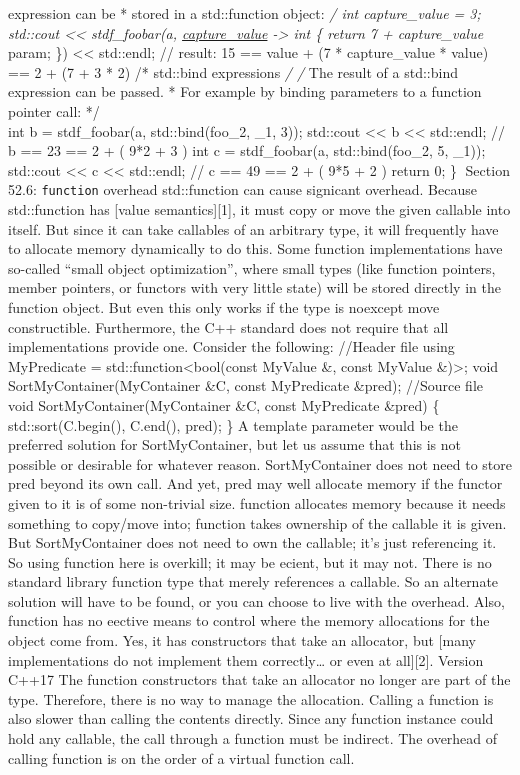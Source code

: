 expression can be * stored in a std::function object: \emph{/ int
capture\_value = 3; std::cout \textless\textless{} stdf\_foobar(a,
\href{int\%20param}{capture\_value} -\textgreater{} int \{ return 7 +
capture\_value } param; \}) \textless\textless{} std::endl; // result:
15 == value + (7 * capture\_value * value) == 2 + (7 + 3 * 2) /*
std::bind expressions \emph{/ /} The result of a std::bind expression
can be passed. * For example by binding parameters to a function pointer
call: */\\
int b = stdf\_foobar(a, std::bind(foo\_2, \_1, 3)); std::cout
\textless\textless{} b \textless\textless{} std::endl; // b == 23 == 2 +
( 9*2 + 3 ) int c = stdf\_foobar(a, std::bind(foo\_2, 5, \_1));
std::cout \textless\textless{} c \textless\textless{} std::endl; // c ==
49 == 2 + ( 9*5 + 2 ) return 0; \} Section 52.6:
\passthrough{\lstinline!function!} overhead std::function can cause
signicant overhead. Because std::function has {[}value
semantics{]}{[}1{]}, it must copy or move the given callable into
itself. But since it can take callables of an arbitrary type, it will
frequently have to allocate memory dynamically to do this. Some function
implementations have so-called ``small object optimization'', where
small types (like function pointers, member pointers, or functors with
very little state) will be stored directly in the function object. But
even this only works if the type is noexcept move constructible.
Furthermore, the C++ standard does not require that all implementations
provide one. Consider the following: //Header file using MyPredicate =
std::function\textless bool(const MyValue \&, const MyValue
\&)\textgreater; void SortMyContainer(MyContainer \&C, const MyPredicate
\&pred); //Source file void SortMyContainer(MyContainer \&C, const
MyPredicate \&pred) \{ std::sort(C.begin(), C.end(), pred); \} A
template parameter would be the preferred solution for SortMyContainer,
but let us assume that this is not possible or desirable for whatever
reason. SortMyContainer does not need to store pred beyond its own call.
And yet, pred may well allocate memory if the functor given to it is of
some non-trivial size. function allocates memory because it needs
something to copy/move into; function takes ownership of the callable it
is given. But SortMyContainer does not need to own the callable; it's
just referencing it. So using function here is overkill; it may be
ecient, but it may not. There is no standard library function type that
merely references a callable. So an alternate solution will have to be
found, or you can choose to live with the overhead. Also, function has
no eective means to control where the memory allocations for the object
come from. Yes, it has constructors that take an allocator, but {[}many
implementations do not implement them correctly\ldots{} or even at
all{]}{[}2{]}. Version C++17 The function constructors that take an
allocator no longer are part of the type. Therefore, there is no way to
manage the allocation. Calling a function is also slower than calling
the contents directly. Since any function instance could hold any
callable, the call through a function must be indirect. The overhead of
calling function is on the order of a virtual function call.


